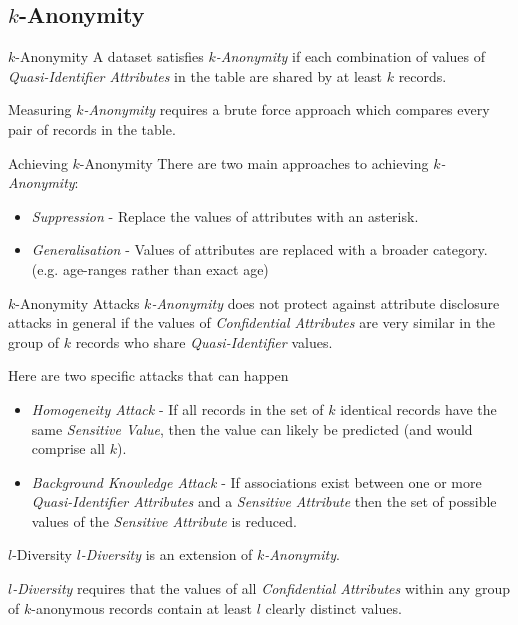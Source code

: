\documentclass[11pt,a4paper]{article}
\begin{document}
\subsection{$k$-Anonymity}\label{sec_k_anonymity}

  \begin{definition}{$k$-Anonymity}
    A dataset satisfies \textit{$k$-Anonymity} if each combination of values of \textit{Quasi-Identifier Attributes} in the table are shared by at least $k$ records.
    \par Measuring \textit{$k$-Anonymity} requires a brute force approach which compares every pair of records in the table.
  \end{definition}

  \begin{proposition}{Achieving $k$-Anonymity}
    There are two main approaches to achieving \textit{$k$-Anonymity}:
    \begin{itemize}
      \item \textit{Suppression} - Replace the values of attributes with an asterisk.
      \item \textit{Generalisation} - Values of attributes are replaced with a broader category. (e.g. age-ranges rather than exact age)
    \end{itemize}
  \end{proposition}

  \begin{proposition}{$k$-Anonymity Attacks}
    \textit{$k$-Anonymity} does not protect against attribute disclosure attacks in general if the values of \textit{Confidential Attributes} are very similar in the group of $k$ records who share \textit{Quasi-Identifier} values.
    \par Here are two specific attacks that can happen
    \begin{itemize}
      \item \textit{Homogeneity Attack} - If all records in the set of $k$ identical records have the same \textit{Sensitive Value}, then the value can likely be predicted (and would comprise all $k$).
      \item \textit{Background Knowledge Attack} - If associations exist between one or more \textit{Quasi-Identifier Attributes} and a \textit{Sensitive Attribute} then the set of possible values of the \textit{Sensitive Attribute} is reduced.
    \end{itemize}
  \end{proposition}

  \begin{definition}{$l$-Diversity}
    \textit{$l$-Diversity} is an extension of \textit{$k$-Anonymity}.
    \par \textit{$l$-Diversity} requires that the values of all \textit{Confidential Attributes} within any group of $k$-anonymous records contain at least $l$ clearly distinct values.
  \end{definition}
\end{document}
